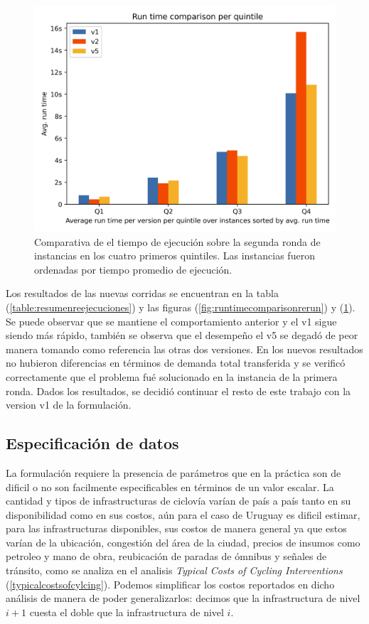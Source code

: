 \documentclass{article}
\begin{document}
  \begin{figure}[h!]
    \centering
    \includegraphics[width=12cm]{../resources/run_time_comparsion_by_quintile_rerun.png}
    \caption{Comparativa de el tiempo de ejecución sobre la segunda ronda de instancias en los cuatro primeros quintiles. Las instancias fueron ordenadas por tiempo promedio de ejecución.} \label{fig:firstfourquintilesrerun}
  \end{figure}

  Los resultados de las nuevas corridas se encuentran en la tabla (\ref{table:resumenreejecuciones}) y las figuras (\ref{fig:runtimecomparisonrerun}) y (\ref{fig:firstfourquintilesrerun}). Se puede observar que se mantiene el comportamiento anterior y el v1 sigue siendo más rápido, también se observa que el desempeño el v5 se degadó de peor manera tomando como referencia las otras dos versiones. En los nuevos resultados no hubieron diferencias en términos de demanda total transferida y se verificó correctamente que el problema fué solucionado en la instancia de la primera ronda. Dados los resultados, se decidió continuar el resto de este trabajo con la version v1 de la formulación.

  \subsection*{Especificación de datos}

  La formulación requiere la presencia de parámetros que en la práctica son de dificil o no son facilmente especificables en términos de un valor escalar. La cantidad y tipos de infrastructuras de ciclovía varían de país a país tanto en su disponibilidad como en sus costos, aún para el caso de Uruguay es dificil estimar, para las infrastructuras disponibles, sus costos de manera general ya que estos varían de la ubicación, congestión del área de la ciudad, precios de insumos como petroleo y mano de obra, reubicación de paradas de ómnibus y señales de tránsito, como se analiza en el analisis {\it Typical Costs of Cycling Interventions} (\ref{typicalcostsofcylcing}). Podemos simplificar los costos reportados en dicho análisis de manera de poder generalizarlos: decimos que la infrastructura de nivel $i+1$ cuesta el doble que la infrastructura de nivel $i$.
\end{document}
